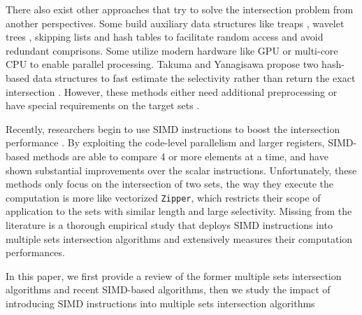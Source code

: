 \documentclass[runningheads,a4paper]{llncs}
\begin{document}
There also exist other approaches that try to solve the intersection problem from another perspectives.
Some build auxiliary data structures like treaps \cite{Blelloch1998Fast,chen2016efficient}, wavelet trees \cite{navarro2010dual}, skipping lists \cite{Culpepper2007Compact,Moffat1996Self} and hash tables \cite{Arroyuelo2010Compressed,Sanders2007Intersection,Ding2011Fast} to facilitate random access and avoid redundant comprisons.
Some utilize modern hardware like GPU \cite{Ao2011Efficient,Wu2009A,Wu2010Efficient} or multi-core CPU \cite{Tatikonda2009On,tsirogiannis2009improving} to enable parallel processing.
Takuma and Yanagisawa propose two hash-based data structures to fast estimate the selectivity rather than return the exact intersection \cite{Takuma2013Faster}.
However, these methods either need additional preprocessing or have special requirements on the target sets \cite{Inoue2014Faster}.

Recently, researchers begin to use SIMD instructions to boost the intersection performance \cite{Inoue2014Faster,Schlegel2010Fast,lemire2016simd}.
By exploiting the code-level parallelism and larger registers, SIMD-based methods are able to compare 4 or more elements at a time, and have shown substantial improvements over the scalar instructions.
Unfortunately, these methods only focus on the intersection of two sets, the way they execute the computation is more like vectorized \texttt{Zipper}, which restricts their scope of application to the sets with similar length and large selectivity.
Missing from the literature is a thorough empirical study that deploys SIMD instructions into multiple sets intersection algorithms and extensively measures their computation performances.

In this paper, we first provide a review of the former multiple sets intersection algorithms and recent SIMD-based algorithms, then we study the impact of introducing SIMD instructions into multiple sets intersection algorithms
 
\end{document}
